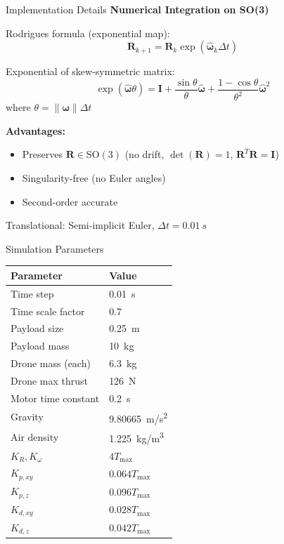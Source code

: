 \documentclass{beamer}
\begin{document}
\begin{frame}{Implementation Details}
\textbf{Numerical Integration on SO(3)}

Rodrigues formula (exponential map):
\[
\mathbf{R}_{k+1} = \mathbf{R}_k \exp(\widehat{\boldsymbol{\omega}}_k \Delta t)
\]

Exponential of skew-symmetric matrix:
\[
\exp(\widehat{\boldsymbol{\omega}} \theta) = \mathbf{I} + \frac{\sin\theta}{\theta}\widehat{\boldsymbol{\omega}} + \frac{1-\cos\theta}{\theta^2}\widehat{\boldsymbol{\omega}}^2
\]
where $\theta = \|\boldsymbol{\omega}\| \Delta t$

\textbf{Advantages:}
\begin{itemize}
    \item Preserves $\mathbf{R} \in \text{SO}(3)$ (no drift, $\det(\mathbf{R})=1$, $\mathbf{R}^T\mathbf{R}=\mathbf{I}$)
    \item Singularity-free (no Euler angles)
    \item Second-order accurate
\end{itemize}

Translational: Semi-implicit Euler, $\Delta t = \SI{0.01}{s}$
\end{frame}

\begin{frame}{Simulation Parameters}
\begin{table}[h]
\centering
\small
\begin{tabular}{ll}
\hline
\textbf{Parameter} & \textbf{Value} \\
\hline
Time step & \SI{0.01}{s} \\
Time scale factor & 0.7 \\
Payload size & \SI{0.25}{m} \\
Payload mass & \SI{10}{kg} \\
Drone mass (each) & \SI{6.3}{kg} \\
Drone max thrust & \SI{126}{N} \\
Motor time constant & \SI{0.2}{s} \\
Gravity & \SI{9.80665}{m/s^2} \\
Air density & \SI{1.225}{kg/m^3} \\
$K_R, K_\omega$ & $4T_{\max}$ \\
$K_{p,xy}$ & $0.064 T_{\max}$ \\
$K_{p,z}$ & $0.096 T_{\max}$ \\
$K_{d,xy}$ & $0.028 T_{\max}$ \\
$K_{d,z}$ & $0.042 T_{\max}$ \\
\hline
\end{tabular}
\end{table}
\end{frame}
\end{document}
